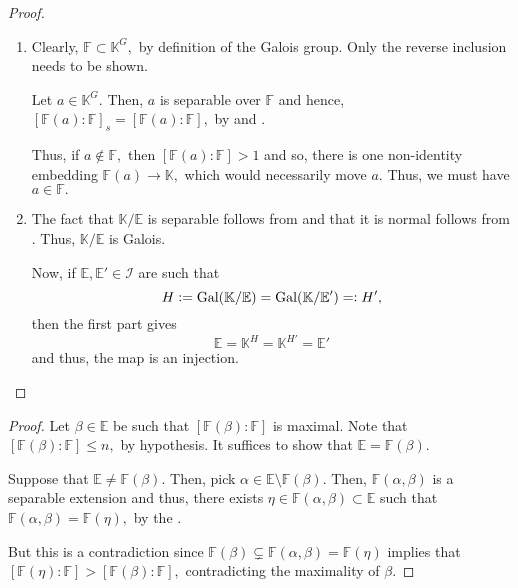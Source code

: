 \fixfieldinjectiveIG*\label{thm:fixfieldinjectiveIG2}
\begin{flushright}\hyperref[thm:fixfieldinjectiveIG]{\upsym}\end{flushright}
\begin{proof}
    \phantom{hi}
    \begin{enumerate}
        \item Clearly, $\mathbb{F} \subset \mathbb{K}^G,$ by definition of the Galois group. Only the reverse inclusion needs to be shown.

        Let $a \in \mathbb{K}^G.$ Then, $a$ is separable over $\mathbb{F}$ and hence, $[\mathbb{F}(a) : \mathbb{F}]_s = [\mathbb{F}(a) : \mathbb{F}],$ by  and .

        Thus, if $a \notin \mathbb{F},$ then $[\mathbb{F}(a) : \mathbb{F}] > 1$ and so, there is one non-identity embedding $\mathbb{F}(a) \to \mathbb{K},$ which would necessarily move $a.$ Thus, we must have $a \in \mathbb{F}.$
        \item The fact that $\mathbb{K}/\mathbb{E}$ is separable follows from  and that it is normal follows from . Thus, $\mathbb{K}/\mathbb{E}$ is Galois.

        Now, if $\mathbb{E}, \mathbb{E}' \in \mathcal{I}$ are such that 
        \begin{equation*} 
            H \vcentcolon= \operatorname{Gal}(\mathbb{K}/\mathbb{E}) = \operatorname{Gal}(\mathbb{K}/\mathbb{E}') =\vcentcolon H',
        \end{equation*}
        then the first part gives
        \begin{equation*} 
            \mathbb{E} = \mathbb{K}^H = \mathbb{K}^{H'} = \mathbb{E}'
        \end{equation*}
        and thus, the map is an injection.
    \end{enumerate}
\end{proof}

\degboundedbyn*\label{lem:degboundedbyn2}
\begin{flushright}\hyperref[lem:degboundedbyn]{\upsym}\end{flushright}
\begin{proof}
    Let $\beta \in \mathbb{E}$ be such that $[\mathbb{F}(\beta) : \mathbb{F}]$ is maximal. Note that $[\mathbb{F}(\beta) : \mathbb{F}] \le n,$ by hypothesis. It suffices to show that $\mathbb{E} = \mathbb{F}(\beta).$

    Suppose that $\mathbb{E} \neq \mathbb{F}(\beta).$ Then, pick $\alpha \in \mathbb{E} \setminus \mathbb{F}(\beta).$ Then, $\mathbb{F}(\alpha, \beta)$ is a separable extension and thus, there exists $\eta \in \mathbb{F}(\alpha, \beta) \subset \mathbb{E}$ such that $\mathbb{F}(\alpha, \beta) = \mathbb{F}(\eta),$ by the .

    But this is a contradiction since $\mathbb{F}(\beta) \subsetneq \mathbb{F}(\alpha, \beta) = \mathbb{F}(\eta)$ implies that $[\mathbb{F}(\eta) : \mathbb{F}] > [\mathbb{F}(\beta) : \mathbb{F}],$ contradicting the maximality of $\beta.$
\end{proof}


